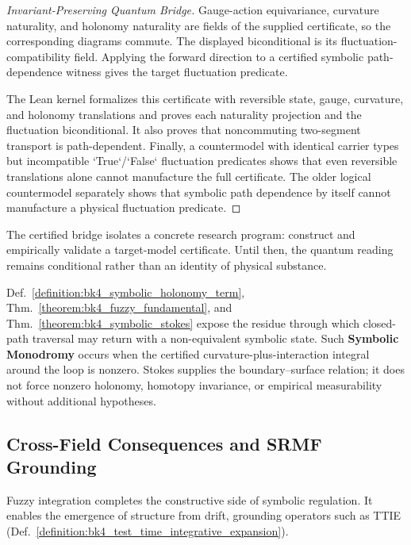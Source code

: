 \begin{proof}[Invariant-Preserving Quantum Bridge]
\label{proof:bk4_quantum_geometry}
Gauge-action equivariance, curvature naturality, and holonomy naturality are
fields of the supplied certificate, so the corresponding diagrams commute.
The displayed biconditional is its fluctuation-compatibility field.  Applying
the forward direction to a certified symbolic path-dependence witness gives
the target fluctuation predicate.

The Lean kernel formalizes this certificate with reversible state, gauge,
curvature, and holonomy translations and proves each naturality projection and
the fluctuation biconditional.  It also proves that noncommuting two-segment
transport is path-dependent.  Finally, a countermodel with identical carrier
types but incompatible `True`/`False` fluctuation predicates shows that even
reversible translations alone cannot manufacture the full certificate.  The
older logical countermodel separately shows that symbolic path dependence by
itself cannot manufacture a physical fluctuation predicate.
\end{proof}

The certified bridge isolates a concrete research program: construct and empirically validate a target-model certificate. Until then, the quantum reading remains conditional rather than an identity of physical substance.

\begin{scholium}
\label{scholium:bk4_symbolic_monodromy}
Def.~\ref{definition:bk4_symbolic_holonomy_term}, Thm.~\ref{theorem:bk4_fuzzy_fundamental}, and Thm.~\ref{theorem:bk4_symbolic_stokes} expose the residue through which closed-path traversal may return with a non-equivalent symbolic state. Such \textbf{Symbolic Monodromy} occurs when the certified curvature-plus-interaction integral around the loop is nonzero. Stokes supplies the boundary--surface relation; it does not force nonzero holonomy, homotopy invariance, or empirical measurability without additional hypotheses.
\end{scholium}

\subsection{Cross-Field Consequences and SRMF Grounding}
\label{subsec:bk4_fuzzy_integration_applications}

Fuzzy integration completes the constructive side of symbolic regulation. It enables the emergence of structure from drift, grounding operators such as TTIE (Def.~\ref{definition:bk4_test_time_integrative_expansion}).


